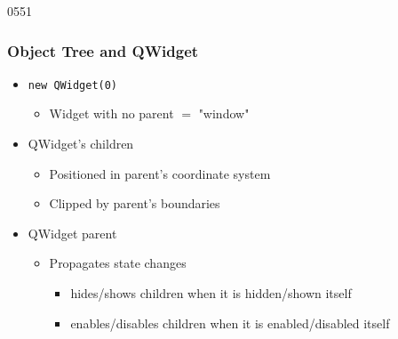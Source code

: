 
\begin{slide}[fragile]{0551}\frametitle{Object Tree and QWidget}
  \begin{itemize}
  \item \texttt{new QWidget(0)}
    \begin{itemize}
    \item Widget with no parent $=$ "window"
    \end{itemize}\medskip

  \item QWidget's children
    \begin{itemize}
    \item Positioned in parent's coordinate system
    \item Clipped by parent's boundaries
    \end{itemize}\medskip

  \item QWidget parent
    \begin{itemize}
    \item Propagates state changes
      \begin{itemize}
      \item hides/shows children when it is hidden/shown itself
      \item enables/disables children when it is enabled/disabled itself
      \end{itemize}
    \end{itemize}
 \end{itemize}
\end{slide}

